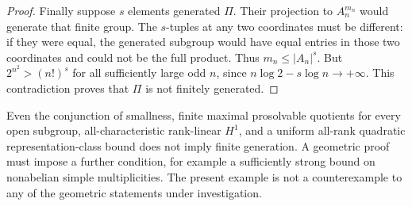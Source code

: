 \begin{proof}
Finally suppose \(s\) elements generated \(\Pi\).
Their projection to \(A_n^{m_n}\) would generate that finite group.
The \(s\)-tuples at any two coordinates must be different: if
they were equal, the generated subgroup would have equal entries
in those two coordinates and could not be the full product.
Thus \(m_n\leq|A_n|^s\).
But \(2^{n^2}>(n!)^s\) for all sufficiently large odd \(n\), since
\(n\log 2-s\log n\to+\infty\).
This contradiction proves that \(\Pi\) is not finitely generated.
\end{proof}

\begin{remark}
Even the conjunction of smallness, finite maximal prosolvable quotients
for every open subgroup, all-characteristic rank-linear \(H^1\), and
a uniform all-rank quadratic representation-class bound does not imply
finite generation. A geometric proof must impose a further condition,
for example a sufficiently strong bound on nonabelian simple
multiplicities. The present example is not a counterexample to any
of the geometric statements under investigation.
\end{remark}


